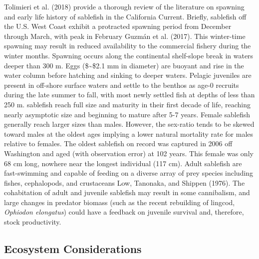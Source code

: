 \documentclass[11pt,
  english,
  a4paper,
]{article}
\begin{document}
{Tolimieri et al. (2018)\leavevmode\tagmcend\tagstructend} provide a thorough review of the literature on spawning and early life history of sablefish in the California Current. Briefly, sablefish off the U.S. West Coast exhibit a protracted spawning period from December through March, with peak in February {Guzmán et al. (2017)\leavevmode\tagmcend\tagstructend}. This winter-time spawning may result in reduced availability to the commercial fishery during the winter months. Spawning occurs along the continental shelf-slope break in waters deeper than 300 m. Eggs (\$\sim\$2.1 mm in diameter) are buoyant and rise in the water column before hatching and sinking to deeper waters. Pelagic juveniles are present in off-shore surface waters and settle to the benthos as age-0 recruits during the late summer to fall, with most newly settled fish at depths of less than 250 m. sablefish reach full size and maturity in their first decade of life, reaching nearly asymptotic size and beginning to mature after 5-7 years. Female sablefish generally reach larger sizes than males. However, the sex-ratio tends to be skewed toward males at the oldest ages implying a lower natural mortality rate for males relative to females. The oldest sablefish on record was captured in 2006 off Washington and aged (with observation error) at 102 years. This female was only 68 cm long, nowhere near the longest individual (117 cm). Adult sablefish are fast-swimming and capable of feeding on a diverse array of prey species including fishes, cephalopods, and crustaceans {Low, Tanonaka, and Shippen (1976)\leavevmode\tagmcend\tagstructend}. The cohabitation of adult and juvenile sablefish may result in some cannibalism, and large changes in predator biomass (such as the recent rebuilding of lingcod, \emph{Ophiodon elongatus}) could have a feedback on juvenile survival and, therefore, stock productivity.

\leavevmode\tagmcend\tagstructend\par


\hypertarget{ecosystem-considerations}{%
\subsection{Ecosystem Considerations}\label{ecosystem-considerations}}
\end{document}
